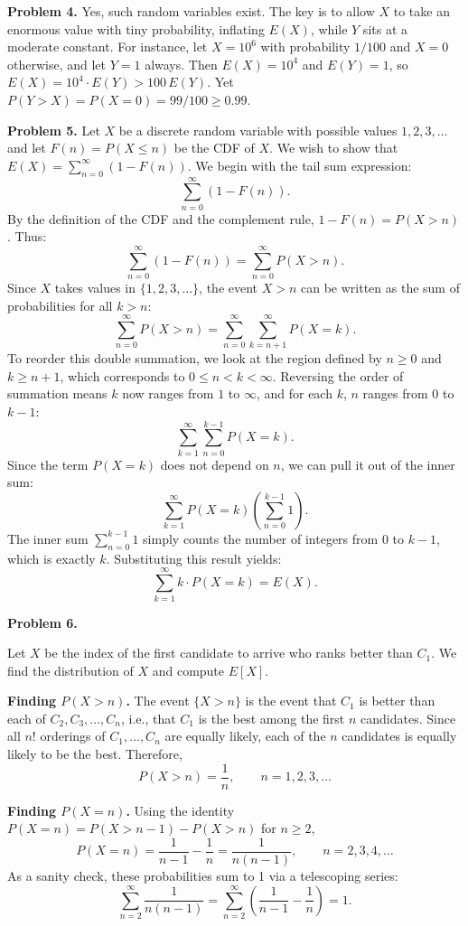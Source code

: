 \documentclass{article}
\begin{document}
\bigskip
\textbf{Problem 4.} Yes, such random variables exist. The key is to allow $X$ to take an enormous value with tiny probability, inflating $E(X)$, while $Y$ sits at a moderate constant. For instance, let $X=10^6$ with probability $1/100$ and $X=0$ otherwise, and let $Y=1$ always. Then $E(X)=10^4$ and $E(Y)=1$, so $E(X)=10^4\cdot E(Y)>100\,E(Y)$. Yet $P(Y>X)=P(X=0)=99/100\ge0.99$.

\bigskip
\textbf{Problem 5.} Let $X$ be a discrete random variable with possible values $1, 2, 3, \dots$ and let $F(n) = P(X \le n)$ be the CDF of $X$. We wish to show that $E(X) = \sum_{n=0}^{\infty} (1 - F(n))$. We begin with the tail sum expression:
$$
\sum_{n=0}^{\infty} (1 - F(n)).
$$
By the definition of the CDF and the complement rule, $1 - F(n) = P(X > n)$. Thus:
$$
\sum_{n=0}^{\infty} (1 - F(n)) = \sum_{n=0}^{\infty} P(X > n).
$$
Since $X$ takes values in $\{1, 2, 3, \dots\}$, the event $X > n$ can be written as the sum of probabilities for all $k > n$:
$$
\sum_{n=0}^{\infty} P(X > n) = \sum_{n=0}^{\infty} \sum_{k=n+1}^{\infty} P(X = k).
$$
To reorder this double summation, we look at the region defined by $n \ge 0$ and $k \ge n+1$, which corresponds to $0 \le n < k < \infty$. Reversing the order of summation means $k$ now ranges from $1$ to $\infty$, and for each $k$, $n$ ranges from $0$ to $k-1$:
$$
\sum_{k=1}^{\infty} \sum_{n=0}^{k-1} P(X = k).
$$
Since the term $P(X = k)$ does not depend on $n$, we can pull it out of the inner sum:
$$
\sum_{k=1}^{\infty} P(X = k) \left( \sum_{n=0}^{k-1} 1 \right).
$$
The inner sum $\sum_{n=0}^{k-1} 1$ simply counts the number of integers from $0$ to $k-1$, which is exactly $k$. Substituting this result yields:
$$
\sum_{k=1}^{\infty} k \cdot P(X = k) = E(X).
$$

\bigskip
\textbf{Problem 6.} 

Let $X$ be the index of the first candidate to arrive who ranks better than $C_1$. We find the distribution of $X$ and compute $E[X]$.

\bigskip
\textbf{Finding $P(X > n)$.}
The event $\{X > n\}$ is the event that $C_1$ is better than each of $C_2, C_3, \ldots, C_n$, i.e., that $C_1$ is the best among the first $n$ candidates. Since all $n!$ orderings of $C_1, \ldots, C_n$ are equally likely, each of the $n$ candidates is equally likely to be the best. Therefore,
\[
  P(X > n) = \frac{1}{n}, \qquad n = 1, 2, 3, \ldots
\]

\bigskip
\textbf{Finding $P(X = n)$.}
Using the identity $P(X = n) = P(X > n-1) - P(X > n)$ for $n \geq 2$,
\[
  P(X = n) = \frac{1}{n-1} - \frac{1}{n} = \frac{1}{n(n-1)}, \qquad n = 2, 3, 4, \ldots
\]
As a sanity check, these probabilities sum to 1 via a telescoping series:
\[
  \sum_{n=2}^{\infty} \frac{1}{n(n-1)}
  = \sum_{n=2}^{\infty} \left(\frac{1}{n-1} - \frac{1}{n}\right)
  = 1.
\]
\end{document}
